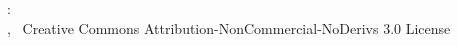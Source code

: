 \thispagestyle{empty}

\hfill

\vfill

\noindent\myName: \\ \textit{\myTitle} \mySubtitle,
\textcopyright\ Creative Commons Attribution-NonCommercial-NoDerivs 3.0 License \myTime

%
%
%
%
%
